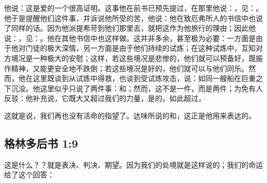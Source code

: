 他说：这是爱的一个很高证明。这事他在前书已预先提过，在那里他说：，见：。他于是提醒他们这件事，并诉说他所受的苦，他说：他在致厄弗所人的书信中也说了同样的话。因为他派提希苛到他们那里去，就把这作为他旅行的理由；因此他说：，见：。他在其他书信中也这样做。这并非多余，甚至极为必要：一方面是由于他对门徒的极大深情，另一方面是由于他们持续的试炼；在这种试炼中，互知对方境况是一种极大的安慰；这样，若这些境况是悲惨的，他们就可以预备好，既振作精神，又能更安全地不跌倒；若这些境况是好的，他们就可以与他们同乐。然而，他在这里既谈到从试炼中得救，也谈到受试炼攻击，说：如同一艘船在巨重之下沉没。他这里似乎只说了两件事：和；然而，这不是一件，而是两件；为免有人反驳：他补充说，它既大又超过我们的力量，是的，如此超过，\par

这就是说，我们再也没有活命的指望了。达味所说的和，这正是他用来表达的。\par


\subsection{格林多后书 1:9}

\par

这是什么？？就是表决、判决、期望。因为我们的处境就是这样说的；我们的命运给了这个回答：\par

